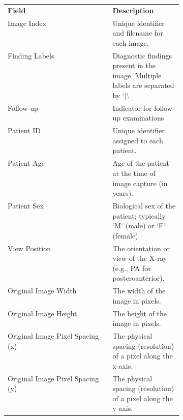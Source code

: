 \documentclass[letterpaper]{article} %
\begin{document}
\begin{tabular}{|l|p{0.4\linewidth}|}
 \hline
 \textbf{Field} & \textbf{Description} \\
 Image Index & Unique identifier and filename for each image. \\
 Finding Labels & Diagnostic findings present in the image. Multiple labels are separated by `|`. \\
 Follow-up & Indicator for follow-up examinations\\
 Patient ID & Unique identifier assigned to each patient. \\
 Patient Age & Age of the patient at the time of image capture (in years). \\
 Patient Sex & Biological sex of the patient; typically `M` (male) or `F` (female). \\
 View Position & The orientation or view of the X-ray (e.g., PA for posteroanterior). \\
 Original Image Width & The width of the image in pixels. \\
 Original Image Height & The height of the image in pixels. \\
 Original Image Pixel Spacing (x) & The physical spacing (resolution) of a pixel along the x-axis. \\
 Original Image Pixel Spacing (y) & The physical spacing (resolution) of a pixel along the y-axis. \\ 
 \hline
\end{tabular}
\end{document}
